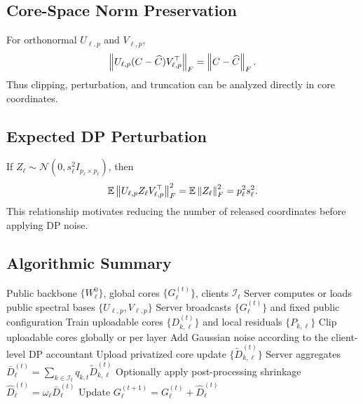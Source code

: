 \subsection{Core-Space Norm Preservation}
For orthonormal $U_{\ell,p}$ and $V_{\ell,p}$,
\begin{equation}
  \left\lVert U_{\ell,p}(C-\widehat{C})V_{\ell,p}^{\top} \right\rVert_F
  =
  \left\lVert C-\widehat{C} \right\rVert_F.
\end{equation}
Thus clipping, perturbation, and truncation can be analyzed directly in core coordinates.

\subsection{Expected DP Perturbation}
If $Z_{\ell}\sim\mathcal{N}(0,s_{\ell}^{2}I_{p_{\ell}\times p_{\ell}})$, then
\begin{equation}
  \mathbb{E}\left\lVert U_{\ell,p}Z_{\ell}V_{\ell,p}^{\top} \right\rVert_F^2
  =
  \mathbb{E}\left\lVert Z_{\ell} \right\rVert_F^2
  =
  p_{\ell}^{2}s_{\ell}^{2}.
\end{equation}
This relationship motivates reducing the number of released coordinates before applying DP noise.

\subsection{Algorithmic Summary}
\begin{algorithm}[H]
\caption{\method{} training round}
\label{alg:spectra_round}
\begin{algorithmic}[1]
\Require Public backbone $\{W_\ell^0\}$, global cores $\{G_\ell^{(t)}\}$, clients $\mathcal{I}_t$
\State Server computes or loads public spectral bases $\{U_{\ell,p},V_{\ell,p}\}$
\State Server broadcasts $\{G_\ell^{(t)}\}$ and fixed public configuration
  \State Train uploadable cores $\{D_{k,\ell}^{(t)}\}$ and local residuals $\{P_{k,\ell}\}$
  \State Clip uploadable cores globally or per layer
  \State Add Gaussian noise according to the client-level DP accountant
  \State Upload privatized core update $\{\widetilde{D}_{k,\ell}^{(t)}\}$
\EndFor
\State Server aggregates $\bar{D}_{\ell}^{(t)}=\sum_{k\in\mathcal{I}_t}q_{k,t}\widetilde{D}_{k,\ell}^{(t)}$
\State Optionally apply post-processing shrinkage $\widehat{D}_{\ell}^{(t)}=\omega_{\ell}\bar{D}_{\ell}^{(t)}$
\State Update $G_\ell^{(t+1)}=G_\ell^{(t)}+\widehat{D}_{\ell}^{(t)}$
\end{algorithmic}
\end{algorithm}
